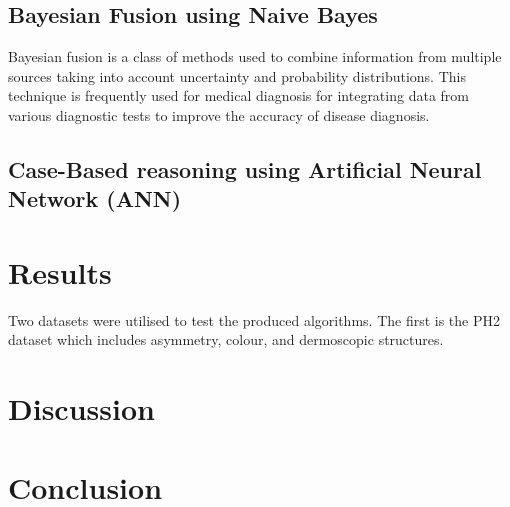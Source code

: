 
\subsection{Bayesian Fusion using Naive Bayes}
Bayesian fusion is a class of methods used to combine information from multiple sources taking into account uncertainty and probability distributions. This technique is frequently used for medical diagnosis for integrating data from various diagnostic tests to improve the accuracy of disease diagnosis\cite{}.


\subsection{Case-Based reasoning using Artificial Neural Network (ANN)}

\section{Results}
Two datasets were utilised to test the produced algorithms. The first is the PH2 dataset which includes asymmetry, colour, and dermoscopic structures.


\section{Discussion}

\section{Conclusion}
